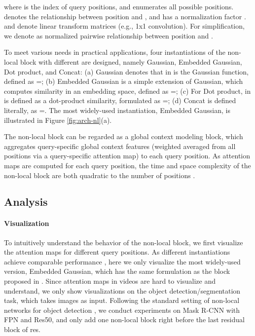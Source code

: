 \documentclass[10pt,twocolumn,letterpaper]{article}
\begin{document}
where  is the index of query positions, and  enumerates all possible positions. 
 denotes the relationship between position  and , and has a normalization factor .
 and  denote linear transform matrices (e.g., 1x1 convolution).
For simplification, we denote  as normalized pairwise relationship between position  and .

To meet various needs in practical applications, four instantiations of the non-local block with different  are designed, namely Gaussian, Embedded Gaussian, Dot product, and Concat:
(a) Gaussian denotes that  in  is the Gaussian function, defined as =;
(b) Embedded Gaussian is a simple extension of Gaussian, which computes similarity in an embedding space, defined as =;
(c) For Dot product,  in  is defined as a dot-product similarity, formulated as =;
(d) Concat is defined literally, as =.
The most widely-used instantiation, Embedded Gaussian, is illustrated in Figure \ref{fig:arch-nl}(a).

The non-local block can be regarded as a global context modeling block, which aggregates query-specific global context features (weighted averaged from all positions via a query-specific attention map) to each query position.
As attention maps are computed for each query position, the time and space complexity of the non-local block are both quadratic to the number of positions .

\subsection{Analysis}

\paragraph{Visualization}
To intuitively understand the behavior of the non-local block, we first visualize the attention maps for different query positions.
As different instantiations achieve comparable performance \cite{wang2017non}, here we only visualize the most widely-used version, Embedded Gaussian, which has the same formulation as the block proposed in \cite{vaswani2017attention}.
Since attention maps in videos are hard to visualize and understand, we only show visualizations on the object detection/segmentation task, which takes images as input.
Following the standard setting of non-local networks for object detection \cite{wang2017non}, we conduct experiments on Mask R-CNN with FPN and Res50, and only add one non-local block right before the last residual block of res.
\end{document}
